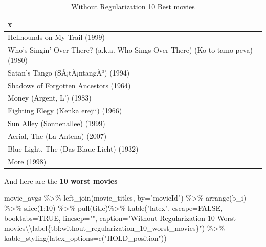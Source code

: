 \documentclass[
]{article}
\newenvironment{Shaded}{}{}
\newcommand{\AttributeTok}[1]{\textcolor[rgb]{0.49,0.56,0.16}{#1}}
\newcommand{\ConstantTok}[1]{\textcolor[rgb]{0.53,0.00,0.00}{#1}}
\newcommand{\DecValTok}[1]{\textcolor[rgb]{0.25,0.63,0.44}{#1}}
\newcommand{\FunctionTok}[1]{\textcolor[rgb]{0.02,0.16,0.49}{#1}}
\newcommand{\NormalTok}[1]{#1}
\newcommand{\SpecialCharTok}[1]{\textcolor[rgb]{0.25,0.44,0.63}{#1}}
\newcommand{\StringTok}[1]{\textcolor[rgb]{0.25,0.44,0.63}{#1}}
\begin{document}
\begin{table}[H]

\caption{\label{tab:reg_3}Without Regularization 10 Best movies\label{tbl:without_regularization_10_best_movies}}
\centering
\begin{tabular}[t]{l}
\toprule
x\\
\midrule
Hellhounds on My Trail (1999)\\
Who's Singin' Over There? (a.k.a. Who Sings Over There) (Ko to tamo peva) (1980)\\
Satan's Tango (SÃ¡tÃ¡ntangÃ³) (1994)\\
Shadows of Forgotten Ancestors (1964)\\
Money (Argent, L') (1983)\\
Fighting Elegy (Kenka erejii) (1966)\\
Sun Alley (Sonnenallee) (1999)\\
Aerial, The (La Antena) (2007)\\
Blue Light, The (Das Blaue Licht) (1932)\\
More (1998)\\
\bottomrule
\end{tabular}
\end{table}

And here are the \textbf{10 worst movies}

\begin{Shaded}
\begin{Highlighting}[]
\NormalTok{movie\_avgs }\SpecialCharTok{\%\textgreater{}\%} \FunctionTok{left\_join}\NormalTok{(movie\_titles, }\AttributeTok{by=}\StringTok{"movieId"}\NormalTok{) }\SpecialCharTok{\%\textgreater{}\%}
  \FunctionTok{arrange}\NormalTok{(b\_i) }\SpecialCharTok{\%\textgreater{}\%} 
  \FunctionTok{slice}\NormalTok{(}\DecValTok{1}\SpecialCharTok{:}\DecValTok{10}\NormalTok{)  }\SpecialCharTok{\%\textgreater{}\%} 
  \FunctionTok{pull}\NormalTok{(title)}\SpecialCharTok{\%\textgreater{}\%} 
  \FunctionTok{kable}\NormalTok{(}\StringTok{"latex"}\NormalTok{, }\AttributeTok{escape=}\ConstantTok{FALSE}\NormalTok{, }\AttributeTok{booktabs=}\ConstantTok{TRUE}\NormalTok{, }\AttributeTok{linesep=}\StringTok{""}\NormalTok{, }\AttributeTok{caption=}\StringTok{"Without Regularization 10 Worst movies}\SpecialCharTok{\textbackslash{}\textbackslash{}}\StringTok{label\{tbl:without\_regularization\_10\_worst\_movies\}"}\NormalTok{) }\SpecialCharTok{\%\textgreater{}\%}
    \FunctionTok{kable\_styling}\NormalTok{(}\AttributeTok{latex\_options=}\FunctionTok{c}\NormalTok{(}\StringTok{"HOLD\_position"}\NormalTok{))}
\end{Highlighting}
\end{Shaded}
\end{document}
